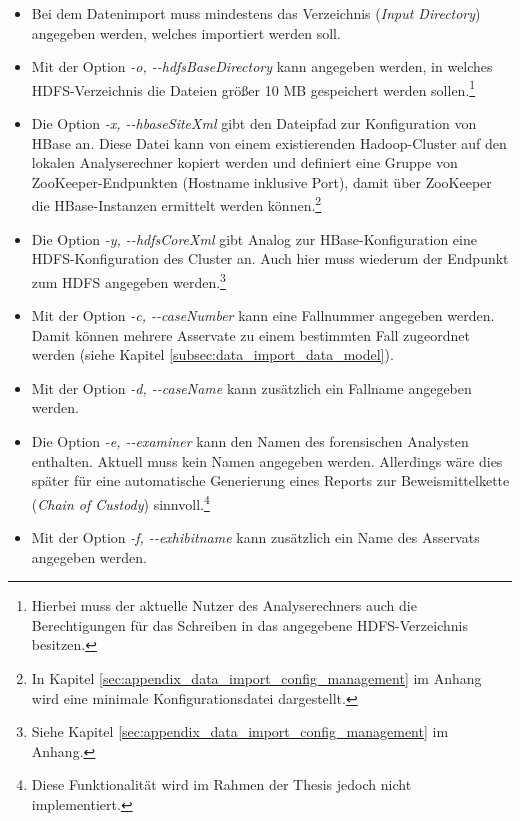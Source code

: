 \begin{itemize}
\item Bei dem Datenimport muss mindestens das Verzeichnis (\textit{Input Directory}) angegeben werden, welches importiert werden soll.
 
\item Mit der Option \textit{-o, -{}-hdfsBaseDirectory} kann angegeben werden, in welches HDFS-Verzeichnis die Dateien größer 10 MB gespeichert werden sollen.\footnote{Hierbei muss der aktuelle Nutzer des Analyserechners auch die Berechtigungen für das Schreiben in das angegebene HDFS-Verzeichnis besitzen.}

\item Die Option \textit{-x, -{}-hbaseSiteXml} gibt den Dateipfad zur Konfiguration von HBase an. Diese Datei kann von einem existierenden Hadoop-Cluster auf den lokalen Analyserechner kopiert werden und definiert eine Gruppe von ZooKeeper-Endpunkten (Hostname inklusive Port), damit über ZooKeeper die HBase-Instanzen ermittelt werden können.\footnote{ In Kapitel \ref{sec:appendix_data_import_config_management} im Anhang wird eine minimale Konfigurationsdatei dargestellt.}

\item Die Option \textit{-y, -{}-hdfsCoreXml} gibt Analog zur HBase-Konfiguration eine HDFS-Konfiguration des Cluster an. Auch hier muss wiederum der Endpunkt zum HDFS angegeben werden.\footnote{Siehe Kapitel \ref{sec:appendix_data_import_config_management} im Anhang.}

\item Mit der Option \textit{-c, -{}-caseNumber} kann eine Fallnummer angegeben werden. Damit können mehrere Asservate zu einem bestimmten Fall zugeordnet werden (siehe Kapitel \ref{subsec:data_import_data_model}).

\item Mit der Option \textit{-d, -{}-caseName} kann zusätzlich ein Fallname angegeben werden.

\item Die Option \textit{-e, -{}-examiner} kann den Namen des forensischen Analysten enthalten. Aktuell muss kein Namen angegeben werden. Allerdings wäre dies später für eine automatische Generierung eines Reports zur Beweismittelkette (\textit{Chain of Custody}) sinnvoll.\footnote{Diese Funktionalität wird im Rahmen der Thesis jedoch nicht implementiert.}

\item Mit der Option \textit{-f, -{}-exhibitname} kann zusätzlich ein Name des Asservats angegeben werden.

\end{itemize}

